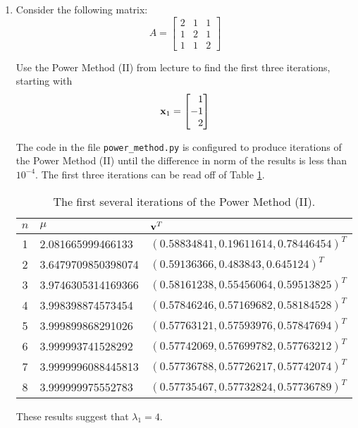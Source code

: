 \documentclass[11pt,oneside,english,reqno]{amsart}
\theoremstyle{definition}
\newcommand{\1}{\mathbbm{1}}
\begin{document}
\begin{enumerate}[leftmargin=*]
\vfill
\pagebreak


\item Consider the following matrix:
\begin{equation}
A=\begin{bmatrix}2 & 1 & 1\\ 1 & 2 & 1\\ 1 & 1 & 2\end{bmatrix}
\end{equation}

Use the Power Method (II) from lecture to find the first three iterations, starting with 
\begin{equation}
{\bf x}_1=\begin{bmatrix*}[r]1 \\ -1 \\ 2\end{bmatrix*}
\end{equation}

The code in the file \verb!power_method.py! is configured to produce iterations of the Power Method (II) until the difference in norm of the results is less than $10^{-4}$. The first three iterations can be read off of Table \ref{tbl:3}.

\begin{table}[H]
\centering
\caption{The first several iterations of the Power Method (II).}\label{tbl:3}
\begin{tabular}{|c|l|l|}
\hline
$n$ & $\mu$ & ${\bf v}^T$ \\[2mm]
\hline
1 & 2.081665999466133 & $(0.58834841, 0.19611614, 0.78446454)^T$ \\[2mm]
2 & 3.6479709850398074 & $(0.59136366, 0.483843,   0.645124  )^T$ \\[2mm]
3 & 3.9746305314169366 & $(0.58161238, 0.55456064, 0.59513825)^T$ \\[2mm]
4 & 3.998398874573454 & $(0.57846246, 0.57169682, 0.58184528)^T$ \\[2mm]
5 & 3.999899868291026 & $(0.57763121, 0.57593976, 0.57847694)^T$ \\[2mm]
6 & 3.999993741528292 & $(0.57742069, 0.57699782, 0.57763212)^T$ \\[2mm]
7 & 3.9999996088445813 & $(0.57736788, 0.57726217, 0.57742074)^T$ \\[2mm]
8 & 3.999999975552783 & $(0.57735467, 0.57732824, 0.57736789)^T$\\[2mm]
\hline
\end{tabular}
\end{table}
These results suggest that $\lambda_1=4$.


\end{enumerate}
\end{document}
